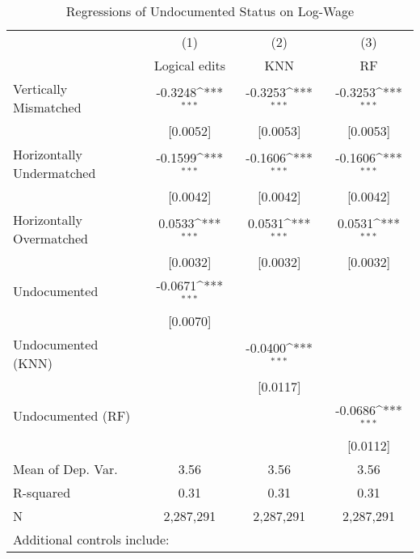 \begin{table}[htbp]\centering
\def\sym#1{\ifmmode^{#1}\else\(^{#1}\)\fi}
\caption{Regressions of Undocumented Status on Log-Wage}
\begin{tabular}{l*{3}{c}}
\toprule
                    &\multicolumn{1}{c}{(1)}         &\multicolumn{1}{c}{(2)}         &\multicolumn{1}{c}{(3)}         \\
                    &Logical edits         &         KNN         &          RF         \\
\midrule
Vertically Mismatched&     -0.3248\sym{***}&     -0.3253\sym{***}&     -0.3253\sym{***}\\
                    &    [0.0052]         &    [0.0053]         &    [0.0053]         \\
\addlinespace
Horizontally Undermatched&     -0.1599\sym{***}&     -0.1606\sym{***}&     -0.1606\sym{***}\\
                    &    [0.0042]         &    [0.0042]         &    [0.0042]         \\
\addlinespace
Horizontally Overmatched&      0.0533\sym{***}&      0.0531\sym{***}&      0.0531\sym{***}\\
                    &    [0.0032]         &    [0.0032]         &    [0.0032]         \\
\addlinespace
Undocumented        &     -0.0671\sym{***}&                     &                     \\
                    &    [0.0070]         &                     &                     \\
\addlinespace
Undocumented (KNN)  &                     &     -0.0400\sym{***}&                     \\
                    &                     &    [0.0117]         &                     \\
\addlinespace
Undocumented (RF)   &                     &                     &     -0.0686\sym{***}\\
                    &                     &                     &    [0.0112]         \\
\midrule
Mean of Dep. Var.   &        3.56         &        3.56         &        3.56         \\
R-squared           &        0.31         &        0.31         &        0.31         \\
N                   &   2,287,291         &   2,287,291         &   2,287,291         \\
\bottomrule
\multicolumn{4}{l}{\footnotesize Additional controls include:}\\

\end{tabular}
\end{table}
